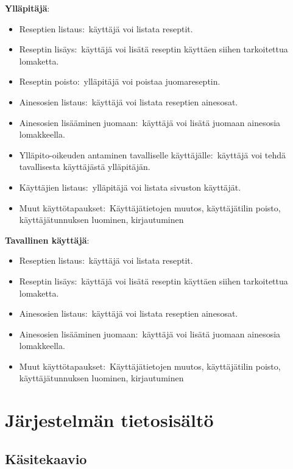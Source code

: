 \documentclass[a4paper]{article}
\begin{document}
\begin{flushleft}\textbf{Ylläpitäjä\(\colon\)} \end{flushleft}
\begin{itemize}
	\item Reseptien listaus\(\colon\) käyttäjä voi listata reseptit.
	\item Reseptin lisäys\(\colon\) käyttäjä voi lisätä reseptin käyttäen siihen tarkoitettua lomaketta. 
	\item Reseptin poisto\(\colon\) ylläpitäjä voi poistaa juomareseptin.
	\item Ainesosien listaus\(\colon\) käyttäjä voi listata reseptien ainesosat.
	\item Ainesosien lisääminen juomaan\(\colon\) käyttäjä voi lisätä juomaan ainesosia lomakkeella.
	\item Ylläpito-oikeuden antaminen tavalliselle käyttäjälle\(\colon\) käyttäjä voi tehdä tavallisesta käyttäjästä ylläpitäjän.
	\item Käyttäjien listaus\(\colon\) ylläpitäjä voi listata sivuston käyttäjät.
	\item Muut käyttötapaukset\(\colon\) Käyttäjätietojen muutos, käyttäjätilin poisto, käyttäjätunnuksen luominen, kirjautuminen
\end{itemize}

\begin{flushleft}\textbf{Tavallinen käyttäjä\(\colon\)} \end{flushleft}

\begin{itemize}
		\item Reseptien listaus\(\colon\) käyttäjä voi listata reseptit.
	\item Reseptin lisäys\(\colon\) käyttäjä voi lisätä reseptin käyttäen siihen tarkoitettua lomaketta. 
	\item Ainesosien listaus\(\colon\) käyttäjä voi listata reseptien ainesosat.
	\item Ainesosien lisääminen juomaan\(\colon\) käyttäjä voi lisätä juomaan ainesosia lomakkeella.
	\item Muut käyttötapaukset\(\colon\) Käyttäjätietojen muutos, käyttäjätilin poisto, käyttäjätunnuksen luominen, kirjautuminen
\end{itemize}

\newpage
\section{Järjestelmän tietosisältö}
\subsection{Käsitekaavio}
\end{document}
